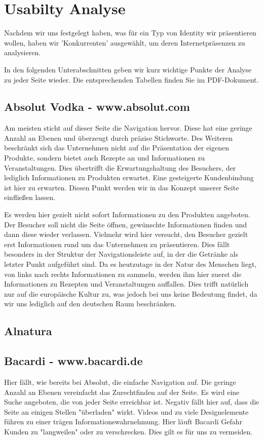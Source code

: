 \documentclass[12pt,a4paper,oneside,ngerman]{article}
\begin{document}
\section{Usabilty Analyse} %
Nachdem wir uns festgelegt haben, was für ein Typ von Identity wir präsentieren wollen, haben wir 'Konkurrenten' ausgewählt, um deren Internetpräsenzen zu analysieren. 

In den folgenden Unterabschnitten geben wir kurz wichtige Punkte der Analyse zu jeder Seite wieder. Die entsprechenden Tabellen finden Sie im PDF-Dokument. %

\subsection{Absolut Vodka - www.absolut.com} %
Am meisten sticht auf dieser Seite die Navigation hervor. Diese hat eine geringe Anzahl an Ebenen und überzeugt durch präzise Stichworte. Des Weiteren beschränkt sich das Unternehmen nicht auf die Präsentation der eigenen Produkte, sondern bietet auch Rezepte an und Informationen zu Veranstaltungen. Dies übertrifft die Erwartungshaltung des Besuchers, der lediglich Informationen zu Produkten erwartet. Eine gesteigerte Kundenbindung ist hier zu erwarten. Diesen Punkt werden wir in das Konzept unserer Seite einfließen lassen.

Es werden hier gezielt nicht sofort Informationen zu den Produkten angeboten. Der Besucher soll nicht die Seite öffnen, gewünschte Informationen finden und dann diese wieder verlassen. Vielmehr wird hier versucht, den Besucher gezielt erst Informationen rund um das Unternehmen zu präsentieren. Dies fällt besonders in der Struktur der Navigationsleiste auf, in der die Getränke als letzter Punkt aufgeführt sind. Da es heutzutage in der Natur des Menschen liegt, von links nach rechts Informationen zu sammeln, werden ihm hier zuerst die Informationen zu Rezepten und Veranstaltungen auffallen. Dies trifft natürlich nur auf die europäische Kultur zu, was jedoch bei uns keine Bedeutung findet, da wir uns lediglich auf den deutschen Raum beschränken.
\subsection{Alnatura} %

\subsection{Bacardi - www.bacardi.de} %
Hier fällt, wie bereits bei Absolut, die einfache Navigation auf. Die geringe Anzahl an Ebenen vereinfacht das Zurechtfinden auf der Seite. Es wird eine Suche angeboten, die von jeder Seite erreichbar ist. Negativ fällt hier auf, dass die Seite an einigen Stellen "überladen" wirkt. Videos und zu viele Designelemente führen zu einer trägen Informationswahrnehmung. Hier läuft Bacardi Gefahr Kunden zu "langweilen" oder zu verschrecken. Dies gilt es für uns zu vermeiden.
\end{document}
